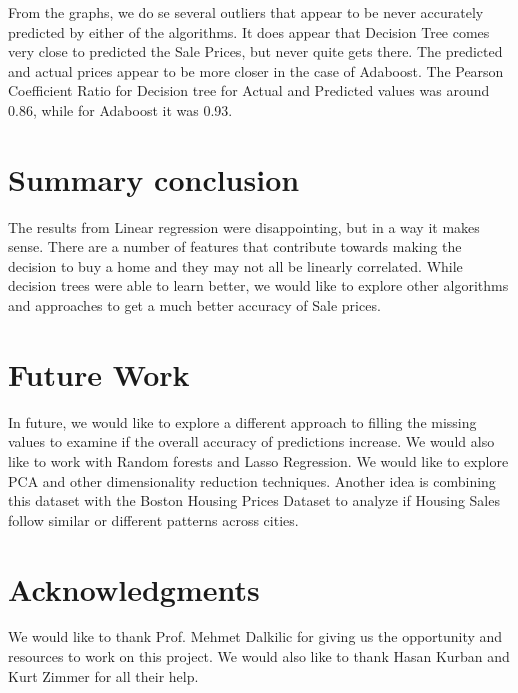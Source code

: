 \documentclass[fleqn,10pt]{SelfArx} %
\begin{document}
	From the graphs, we do se several outliers that appear to be never accurately predicted by either of the algorithms. It does appear that Decision Tree comes very close to predicted the Sale Prices, but never quite gets there. The predicted and actual prices appear to be more closer in the case of Adaboost. The Pearson Coefficient Ratio for Decision tree for Actual and Predicted values was around 0.86, while for Adaboost it was 0.93. 
	
	 
	\section{Summary conclusion}
	The results from Linear regression were disappointing, but in a way it makes sense. There are a number of features that contribute towards making the decision to buy a home and they may not all be linearly correlated. While decision trees were able to learn better, we would like to explore other algorithms and approaches to get a much better accuracy of Sale prices.
	\section{Future Work}
	In future, we would like to explore a different approach to filling the missing values to examine if the overall accuracy of predictions increase. We  would also like to work with Random forests and Lasso Regression. We would like to explore PCA and other dimensionality reduction techniques. Another idea is combining this dataset with the Boston Housing Prices Dataset to analyze if Housing Sales follow similar or different patterns across cities.
	
	\section*{Acknowledgments} %
	
	We would like to thank Prof. Mehmet Dalkilic for giving us the opportunity and resources to work on this project. We would also like to thank Hasan Kurban and Kurt Zimmer for all their help.
	
	
	
	
\end{document}

